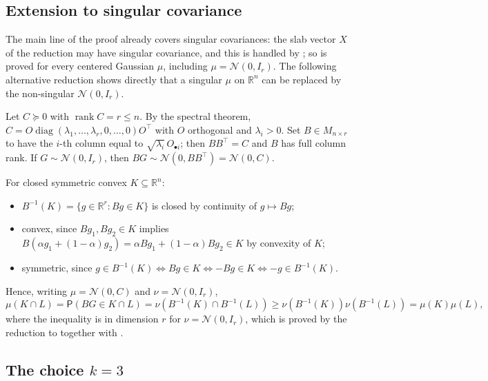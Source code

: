 \documentclass[12pt,a4paper]{article}
\theoremstyle{definition}
\newcommand{\R}{\mathbb{R}}
\newcommand{\PP}{\mathsf{P}}
\newcommand{\rank}{\operatorname{rank}}
\newcommand{\diag}{\operatorname{diag}}
\newcommand{\caln}{\mathcal{N}}
\begin{document}
\subsection{Extension to singular covariance}\label{note:singular}

The main line of the proof already covers singular covariances: the
slab vector $X$ of the reduction may have singular covariance, and this
is handled by ; so  is proved for
every centered Gaussian $\mu$, including $\mu=\caln(0,I_r)$.  The
following alternative reduction shows directly that a singular $\mu$
on $\R^n$ can be replaced by the non-singular $\caln(0,I_r)$.

Let $C\succcurlyeq 0$ with $\rank C=r\leqslant n$.  By the spectral theorem,
$C=O\diag(\lambda_1,\ldots,\lambda_r,0,\ldots,0)O^\top$ with $O$
orthogonal and $\lambda_i>0$.  Set $B\in M_{n\times r}$ to have the
$i$-th column equal to $\sqrt{\lambda_i}\,O_{\bullet i}$; then
$BB^\top=C$ and $B$ has full column rank.  If $G\sim\caln(0,I_r)$,
then $BG\sim\caln(0,BB^\top)=\caln(0,C)$.

For closed symmetric convex $K\subseteq\R^n$:
\begin{itemize}[nosep]
  \item $B^{-1}(K)=\{g\in\R^r:Bg\in K\}$ is closed by continuity of
    $g\mapsto Bg$;
  \item convex, since $Bg_1,Bg_2\in K$ implies
    $B(\alpha g_1+(1-\alpha)g_2)=\alpha Bg_1+(1-\alpha)Bg_2\in K$ by
    convexity of $K$;
  \item symmetric, since $g\in B^{-1}(K)\iff Bg\in K\iff -Bg\in K\iff
    -g\in B^{-1}(K)$.
\end{itemize}
Hence, writing $\mu=\caln(0,C)$ and $\nu=\caln(0,I_r)$,
\[
  \mu(K\cap L)
  =\PP(BG\in K\cap L)
  =\nu(B^{-1}(K)\cap B^{-1}(L))
  \geqslant\nu(B^{-1}(K))\nu(B^{-1}(L))
  =\mu(K)\mu(L),
\]
where the inequality is  in dimension $r$ for
$\nu=\caln(0,I_r)$, which is proved by the reduction to
 together with .

\subsection{The choice \texorpdfstring{$k=3$}{k=3}}\label{note:why_k3}
\end{document}
